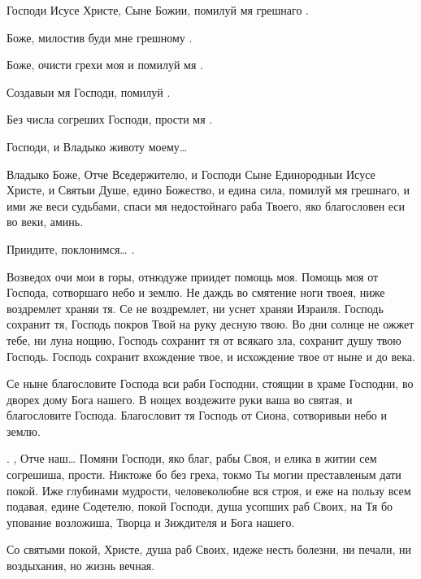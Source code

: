\begin{mymulticols}
 Господи Исусе Христе, Сыне Божии, помилуй мя грешнаго .

Боже, милостив буди мне грешному .

Боже, очисти грехи моя и помилуй мя .

Создавыи мя Господи, помилуй .

Без числа согреших Господи, прости мя .

 Господи, и Владыко животу моему… 


 Владыко Боже, Отче Вседержителю, и Господи Сыне Единородныи Исусе Христе, и Святыи Душе, едино Божество, и едина сила, помилуй мя грешнаго, и ими же веси судьбами, спаси мя недостойнаго раба Твоего, яко благословен еси во веки, аминь. 


 Приидите, поклонимся… . 




Возведох очи мои в горы, отнюдуже приидет помощь моя. Помощь моя от Господа, сотворшаго небо и землю. Не даждь во смятение ноги твоея, ниже воздремлет храняи тя. Се не воздремлет, ни уснет храняи Израиля. Господь сохранит тя, Господь покров Твой на руку десную твою. Во дни солнце не ожжет тебе, ни луна нощию, Господь сохранит тя от всякаго зла, сохранит душу твою Господь. Господь сохранит вхождение твое, и исхождение твое от ныне и до века.




Се ныне благословите Господа вси раби Господни, стоящии в храме Господни, во дворех дому Бога нашего. В нощех воздежите руки ваша во святая, и благословите Господа. Благословит тя Господь от Сиона, сотворивыи небо и землю. 

. ,  Отче наш…  Помяни Господи, яко благ, рабы Своя, и елика в житии сем согрешиша, прости. Никтоже бо без греха, токмо Ты могии преставленым дати покой. Иже глубинами мудрости, человеколюбне вся строя, и еже на пользу всем подавая, едине Содетелю, покой Господи, душа усопших раб Своих, на Тя бо упование возложиша, Творца и Зиждителя и Бога нашего. 

 Со святыми покой, Христе, душа раб Своих, идеже несть болезни, ни печали, ни воздыхания, но жизнь вечная. 


\end{mymulticols}
